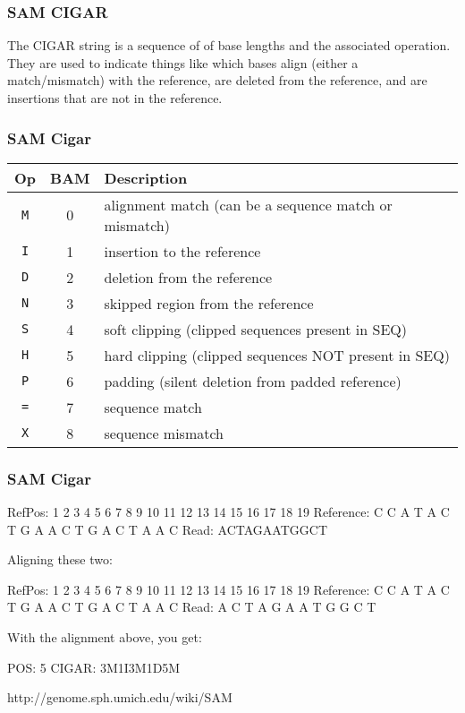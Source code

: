 \documentclass{beamer}
\begin{document}
\begin{frame} 
\frametitle{SAM CIGAR}
The CIGAR string is a sequence of of base lengths and the associated operation. They are used to indicate things like which bases align (either a match/mismatch) with the reference, are deleted from the reference, and are insertions that are not in the reference. 
\end{frame}

\begin{frame} 
\frametitle{SAM Cigar}
\begin{center}\small
  \begin{tabular}{ccl}
  \hline
  Op & BAM & Description\\
  \hline
  {\tt M} & 0 & alignment match (can be a sequence match or mismatch)\\
  {\tt I} & 1 & insertion to the reference \\
  {\tt D} & 2 & deletion from the reference \\
  {\tt N} & 3 & skipped region from the reference \\
  {\tt S} & 4 & soft clipping (clipped sequences present in {\sf SEQ})\\
  {\tt H} & 5 & hard clipping (clipped sequences NOT present in {\sf SEQ})\\
  {\tt P} & 6 & padding (silent deletion from padded reference)\\
  {\tt =} & 7 & sequence match \\
  {\tt X} & 8 & sequence mismatch \\
  \hline
  \end{tabular}
  \end{center}
\end{frame}

\begin{frame} 
\frametitle{SAM Cigar}
RefPos:     1  2  3  4  5  6  7  8  9 10 11 12 13 14 15 16 17 18 19
Reference:  C  C  A  T  A  C  T  G  A  A  C  T  G  A  C  T  A  A  C
Read: ACTAGAATGGCT

Aligning these two:

RefPos:     1  2  3  4  5  6  7     8  9 10 11 12 13 14 15 16 17 18 19
Reference:  C  C  A  T  A  C  T     G  A  A  C  T  G  A  C  T  A  A  C
Read:                   A  C  T  A  G  A  A     T  G  G  C  T

With the alignment above, you get:

POS: 5
CIGAR: 3M1I3M1D5M


http://genome.sph.umich.edu/wiki/SAM
\end{frame}
\end{document}
